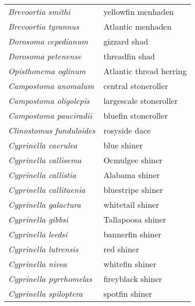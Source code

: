 \documentclass[11pt]{article}
\begin{document}
\newpage

\vspace{\baselineskip}

%
\textbf{\Student}

\begin{tabular}{@{}L{3in}L{3in}@{}}
\textit{Brevoortia smithi} &   yellowfin menhaden\tabularnewline
\textit{Brevoortia tyrannus} &   Atlantic menhaden\tabularnewline
\textit{Dorosoma cepedianum} &   gizzard shad\tabularnewline
\textit{Dorosoma petenense} &   threadfin shad\tabularnewline
\textit{Opisthonema oglinum} &   Atlantic thread herring\tabularnewline
\textit{Campostoma anomalum} &   central stoneroller\tabularnewline
\textit{Campostoma oligolepis} &   largescale stoneroller\tabularnewline
\textit{Campostoma pauciradii} &   bluefin stoneroller\tabularnewline
\textit{Clinostomus funduloides} &   rosyside dace\tabularnewline
\textit{Cyprinella caerulea} &   blue shiner\tabularnewline
\textit{Cyprinella callisema} &   Ocmulgee shiner\tabularnewline
\textit{Cyprinella callistia} &   Alabama shiner\tabularnewline
\textit{Cyprinella callitaenia} &   bluestripe shiner\tabularnewline
\textit{Cyprinella galactura} &   whitetail shiner\tabularnewline
\textit{Cyprinella gibbsi} &   Tallapoosa shiner\tabularnewline
\textit{Cyprinella leedsi} &   bannerfin shiner\tabularnewline
\textit{Cyprinella lutrensis} &   red shiner\tabularnewline
\textit{Cyprinella nivea} &   whitefin shiner\tabularnewline
\textit{Cyprinella pyrrhomelas} &   fireyblack shiner\tabularnewline
\textit{Cyprinella spiloptera} &   spotfin shiner\tabularnewline
\end{tabular}

\vspace{\baselineskip}

%
\textbf{\Student}
\end{document}
